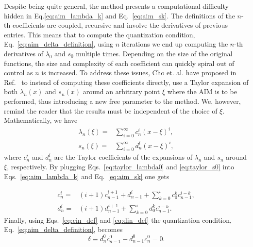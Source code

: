 Despite being quite general, the method presents a computational difficulty hidden in Eq.\eqref{eq:aim_lambda_k} and Eq.~\eqref{eq:aim_sk}. The definitions of the $n$-th coefficients are coupled, recursive and involve the derivatives of previous entries. This means that to compute the quantization condition, Eq.~\eqref{eq:aim_delta_definition}, using $n$ iterations we end up computing the $n$-th derivatives of $\lambda_0$ and $s_0$ multiple times. Depending on the size of the original functions, the size and complexity of each coefficient can quickly spiral out of control as $n$ is increased. To address these issues, Cho et. al. have proposed in Ref.~\cite{aim_improved} to instead of computing these coefficients directly, use a Taylor expansion of both $\lambda_n(x)$ and $s_n(x)$ around an arbitrary point $\xi$ where the AIM is to be performed, thus introducing a new free parameter to the method. We, however, remind the reader that the results must be independent of the choice of $\xi$. Mathematically, we have
%
\begin{align}
  \lambda_n(\xi) = & \sum_{i=0}^{\infty}c^{i}_n(x - \xi)^i, \label{eq:taylor_lambda0} \\
  s_n(\xi) =       & \sum_{i=0}^{\infty}d^{i}_n(x - \xi)^i, \label{eq:taylor_s0}
\end{align}
%
where $c^i_n$ and $d^i_n$ are the Taylor coefficients of the expansions of $\lambda_n$ and $s_n$ around $\xi$, respectively. By plugging Eqs.~\eqref{eq:taylor_lambda0} and \eqref{eq:taylor_s0} into Eqs.~\eqref{eq:aim_lambda_k} and Eq.~\eqref{eq:aim_sk} one gets

\begin{align}
  c^i_n = & (i+1)c^{i+1}_{n-1} + d^i_{n-1} + \sum_{k=0}^{i}c^k_0c^{i-k}_{n-1}, \label{eq:cin_def} \\
  d^i_n = & (i+1)d^{i+1}_{n-1} + \sum_{k=0}^{i}d^k_0c^{i-k}_{n-1}. \label{eq:din_def}
\end{align}
%
Finally, using Eqs.~\eqref{eq:cin_def} and \eqref{eq:din_def} the quantization condition, Eq.~\eqref{eq:aim_delta_definition}, becomes
%
\begin{equation}
  \delta \equiv d^0_n c^0_{n-1} - d^0_{n-1}c^0_n = 0.
  \label{eq:improved_delta}
\end{equation}

